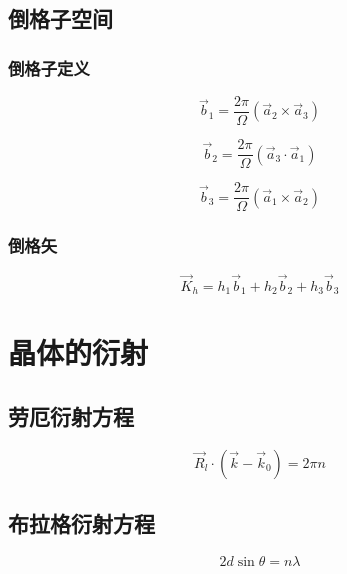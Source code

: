 \documentclass{article}
\begin{document}
\begin{multicols}{2}
\subsection{倒格子空间}

\subsubsection{倒格子定义}

\begin{equation}
  \vec{b}_1 = \frac{2\pi}{\Omega} \left( \vec{a}_2 \times \vec{a}_3 \right)
\end{equation}

\begin{equation}
  \vec{b}_2 = \frac{2\pi}{\Omega} \left( \vec{a}_3 \cdot \vec{a}_1 \right)
\end{equation}

\begin{equation}
  \vec{b}_3 = \frac{2\pi}{\Omega} \left( \vec{a}_1 \times \vec{a}_2 \right)
\end{equation}

\subsubsection{倒格矢}

\begin{equation}
  \vec{K}_h = h_1 \vec{b}_1 + h_2 \vec{b}_2 + h_3 \vec{b}_3
\end{equation}

\section{晶体的衍射}

\subsection{劳厄衍射方程}

\begin{equation}
  \vec{R}_l \cdot \left( \vec{k} - \vec{k}_0 \right) = 2\pi n
\end{equation}

\subsection{布拉格衍射方程}

\begin{equation}
  2d \sin \theta = n\lambda
\end{equation}


\end{multicols}
\end{document}
